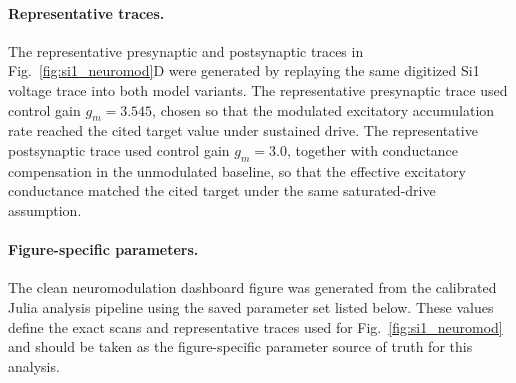 \paragraph{Representative traces.}
The representative presynaptic and postsynaptic traces in Fig.~\ref{fig:si1_neuromod}D were generated by replaying the same digitized Si1 voltage trace into both model variants.
The representative presynaptic trace used control gain $g_m = 3.545$, chosen so that the modulated excitatory accumulation rate reached the cited target value under sustained drive.
The representative postsynaptic trace used control gain $g_m = 3.0$, together with conductance compensation in the unmodulated baseline, so that the effective excitatory conductance matched the cited target under the same saturated-drive assumption.

\paragraph{Figure-specific parameters.}
The clean neuromodulation dashboard figure was generated from the calibrated Julia analysis pipeline using the saved parameter set listed below.
These values define the exact scans and representative traces used for Fig.~\ref{fig:si1_neuromod} and should be taken as the figure-specific parameter source of truth for this analysis.

